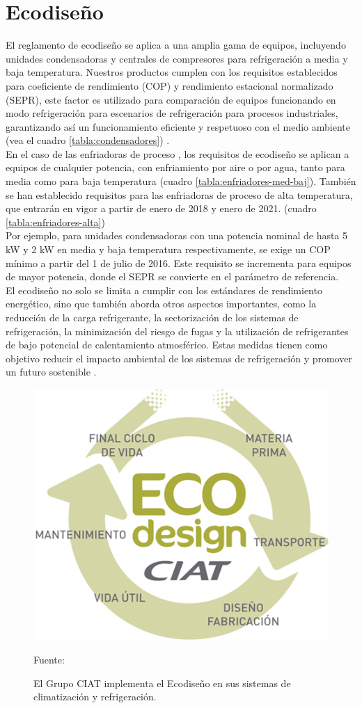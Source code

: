 \section{Ecodiseño}\rsp
El reglamento de ecodiseño se aplica a una amplia gama de equipos, incluyendo unidades condensadoras y centrales de compresores para refrigeración a media y baja temperatura. Nuestros productos cumplen con los requisitos establecidos para coeficiente de rendimiento (COP) y rendimiento estacional normalizado (SEPR), este factor es utilizado para comparación de equipos funcionando en modo refrigeración para escenarios de refrigeración para procesos industriales, garantizando así un funcionamiento eficiente y respetuoso con el medio ambiente (vea el cuadro \ref{tabla:condensadores}) \cite{intarcon-2023}.\\
En el caso de las enfriadoras de proceso , los requisitos de ecodiseño se aplican a equipos de cualquier potencia, con enfriamiento por aire o por agua, tanto para media como para baja temperatura (cuadro \ref{tabla:enfriadores-med-baj}). También se han establecido requisitos para las enfriadoras de proceso de alta temperatura, que entrarán en vigor a partir de enero de 2018 y enero de 2021. (cuadro \ref{tabla:enfriadores-alta})\\
Por ejemplo, para unidades condensadoras con una potencia nominal de hasta 5 kW y 2 kW en media y baja temperatura respectivamente, se exige un COP mínimo a partir del 1 de julio de 2016. Este requisito se incrementa para equipos de mayor potencia, donde el SEPR se convierte en el parámetro de referencia.\\
El ecodiseño no solo se limita a cumplir con los estándares de rendimiento energético, sino que también aborda otros aspectos importantes, como la reducción de la carga refrigerante, la sectorización de los sistemas de refrigeración, la minimización del riesgo de fugas y la utilización de refrigerantes de bajo potencial de calentamiento atmosférico. Estas medidas tienen como objetivo reducir el impacto ambiental de los sistemas de refrigeración y promover un futuro sostenible \cite{caloryfrio-2018}.  
\begin{figure}[H]
	\centering
	\includegraphics[width=0.3\linewidth]{figures/edodis}
	\caption{El Grupo CIAT implementa el Ecodiseño en sus sistemas de climatización y refrigeración.} Fuente: \cite{ciat}
	\label{fig:edodis}
\end{figure}

